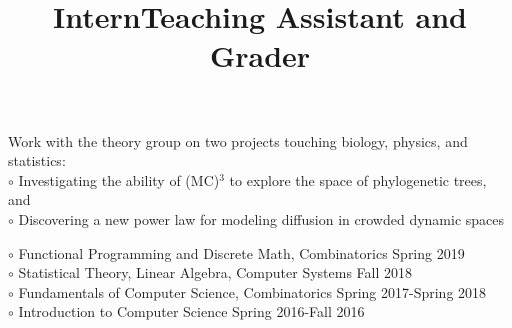 \documentclass[margin]{res}
\begin{document}
\begin{resume}
\title{\textbf{Intern}}
\begin{position}
Work with the theory group on two projects touching biology, physics, and statistics:\\
$\circ$ Investigating the ability of (MC)$^3$ to explore the space of phylogenetic trees, and \\
$\circ$ Discovering a new power law for modeling diffusion in crowded dynamic spaces
\end{position}


%

\dates{}
\title{\textbf{Teaching Assistant and Grader}}
\begin{position}
$\circ$  Functional Programming and Discrete Math, Combinatorics \hfill Spring 2019\\
$\circ$ Statistical Theory, Linear Algebra, Computer Systems \hfill Fall 2018\\
$\circ$  Fundamentals of Computer Science, Combinatorics \hfill Spring 2017-Spring 2018\\
$\circ$ Introduction to Computer Science \hfill Spring 2016-Fall 2016
\end{position}




\end{resume}
\end{document}
